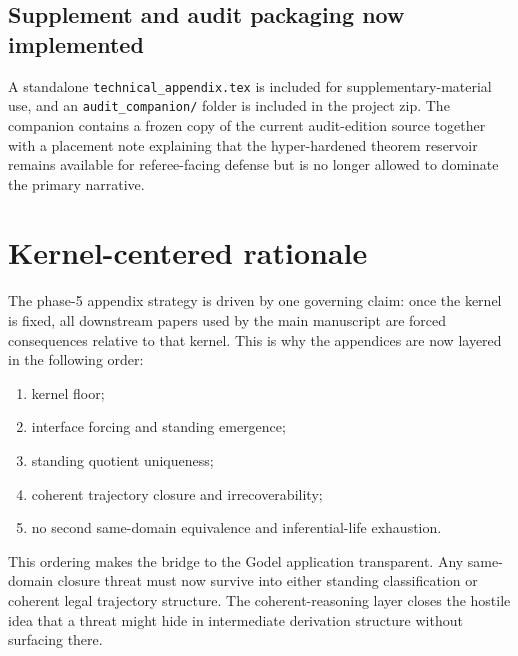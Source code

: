 \documentclass[11pt]{article}
\begin{document}
\subsection*{Supplement and audit packaging now implemented}
A standalone \texttt{technical\_appendix.tex} is included for supplementary-material use, and an \texttt{audit\_companion/} folder is included in the project zip. The companion contains a frozen copy of the current audit-edition source together with a placement note explaining that the hyper-hardened theorem reservoir remains available for referee-facing defense but is no longer allowed to dominate the primary narrative.

\section{Kernel-centered rationale}
The phase-5 appendix strategy is driven by one governing claim: once the kernel is fixed, all downstream papers used by the main manuscript are forced consequences relative to that kernel. This is why the appendices are now layered in the following order:
\begin{enumerate}
  \item kernel floor;
  \item interface forcing and standing emergence;
  \item standing quotient uniqueness;
  \item coherent trajectory closure and irrecoverability;
  \item no second same-domain equivalence and inferential-life exhaustion.
\end{enumerate}
This ordering makes the bridge to the Godel application transparent. Any same-domain closure threat must now survive into either standing classification or coherent legal trajectory structure. The coherent-reasoning layer closes the hostile idea that a threat might hide in intermediate derivation structure without surfacing there.
\end{document}
